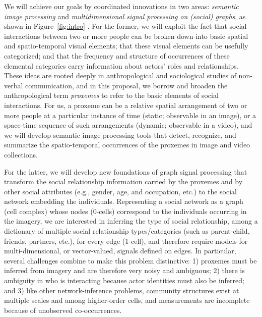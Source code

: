 We will achieve our goals by coordinated innovations in two areas: \emph{semantic image processing} and \emph{multidimensional signal processing on (social) graphs}, as shown in Figure~\ref{fig:intro} . For the former, we will exploit the fact that social interactions between two or more people can be broken down into basic spatial and spatio-temporal visual elements; that these visual elements can be usefully categorized; and that the frequency and structure of occurrences of these elemental categories carry information about actors' roles and relationships. These ideas are rooted deeply in anthropological and sociological studies of non-verbal communication, and in this proposal, we borrow and broaden the anthropological term \emph{proxemes} to refer to the basic elements of social interactions. For us, a proxeme can be a relative spatial arrangement of two or more people at a particular instance of time (static; observable in an image), or a space-time sequence of such arrangements (dynamic; observable in a video), and we will develop semantic image processing tools that detect, recognize, and summarize the spatio-temporal occurrences of the proxemes in image and video collections.

For the latter, we will develop new foundations of graph signal processing that transform the social relationship information carried by the proxemes and by other social attributes (e.g., gender, age, and occupation, etc.) to the social network embedding the individuals. Representing a social network as a graph (cell complex) whose nodes (0-cells) correspond to the individuals occurring in the imagery, we are interested in inferring the type of social relationship, among a dictionary of multiple social relationship types/categories (such as parent-child, friends, partners, etc.), for every edge (1-cell), and therefore require models for multi-dimensional, or vector-valued, signals defined on edges. In particular, several challenges combine to make this problem distinctive: 1) proxemes must be inferred from imagery and are therefore very noisy and ambiguous; 2) there is ambiguity in who is interacting because actor identities must also be inferred; and 3) like other network-inference problems, community structures exist at multiple scales and among higher-order cells, and measurements are incomplete because of unobserved co-occurrences.

